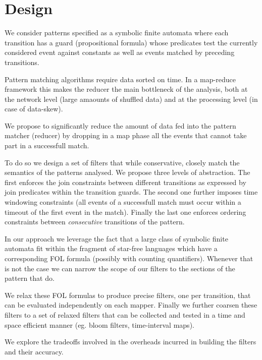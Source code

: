 \section{Design}

We consider patterns specified as a symbolic finite automata where each
transition has a guard (propositional formula) whose predicates test the
currently considered event against constants as well as events matched by
preceding transitions.
   
Pattern matching algorithms require data sorted on time.
In a map-reduce framework this makes the reducer the main bottleneck of the
analysis, both at the network level (large amaounts of shuffled data) and at
the processing level (in case of data-skew).



We propose to significantly reduce the amount of data fed into the pattern
matcher (reducer) by dropping in a map phase all the events that cannot take
part in a successfull match.

To do so we design a set of filters that while conservative, closely match the
semantics of the patterns analysed.
We propose three levels of abstraction.
The first enforces the join constraints between different transitions as
expressed by join predicates within the transition guards.
The second one further imposes time windowing constraints (all events of a
successfull match must occur within a timeout of the first event in the match).
Finally the last one enforces ordering constraints between {\em consecutive}
transitions of the pattern.

In our approach we leverage the fact that a large class of symbolic finite
automata fit within the fragment of star-free languages which
have a corresponding FOL formula (possibly with counting quantifiers).
Whenever that is not the case we can narrow the scope of our filters to the
sections of the pattern that do.
 
We relax these FOL formulas to produce precise filters, one per transition, 
that can be evaluated independently on each mapper.
Finally we further coarsen these filters to a set of relaxed filters
that can be collected and tested in a time and space efficient manner (eg. bloom
filters, time-interval maps).

We explore the tradeoffs involved in the overheads incurred in building the
filters and their accuracy. 



